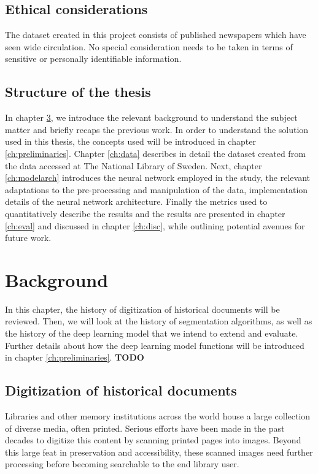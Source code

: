 \documentclass[english, bibtex]{kththesis}
\begin{document}
\section{Ethical considerations}

The dataset created in this project consists of published newspapers which have seen wide circulation. No special consideration needs to be taken in terms of sensitive or personally identifiable information.   

\section{Structure of the thesis}

In chapter \ref{ch:background}, we introduce the relevant background to understand the subject matter and briefly recaps the previous work. In order to understand the solution used in this thesis, the concepts used will be introduced in chapter \ref{ch:preliminaries}. Chapter \ref{ch:data} describes in detail the dataset created from the data accessed at The National Library of Sweden.  Next, chapter \ref{ch:modelarch} introduces the neural network employed in the study, the relevant adaptations to the pre-processing and manipulation of the data, implementation details of the neural network architecture. Finally the metrics used to quantitatively describe the results and the results are presented in chapter \ref{ch:eval} and discussed in chapter \ref{ch:disc}, while outlining potential avenues for future work.

\cleardoublepage
\chapter{Background}
\label{ch:background}

In this chapter, the history of digitization of historical documents will be reviewed. Then, we will look at the history of segmentation algorithms, as well as the history of the deep learning model that we intend to extend and evaluate. Further details about how the deep learning model functions will be introduced in chapter \ref{ch:preliminaries}. \textbf{TODO}

\section{Digitization of historical documents}

Libraries and other memory institutions across the world house a large collection of diverse media, often printed. Serious efforts have been made in the past decades to digitize this content by scanning printed pages into images. Beyond this large feat in preservation and accessibility, these scanned images need further processing before becoming searchable to the end library user. 
\end{document}
